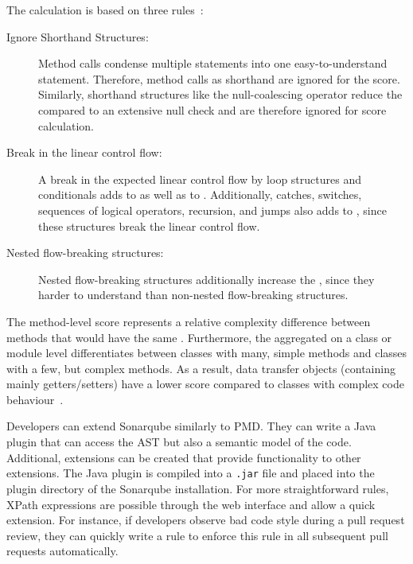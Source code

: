 The calculation is based on three rules~\cite{campbell2018cognitive}:
\begin{description}
    \item[Ignore Shorthand Structures:] Method calls condense multiple statements into one easy-to-understand statement. Therefore, method calls as shorthand are ignored for the score. Similarly, shorthand structures like the null-coalescing operator reduce the  compared to an extensive null check and are therefore ignored for score calculation.
    \item[Break in the linear control flow:] A break in the expected linear control flow by loop structures and conditionals adds to  as well as to . Additionally, catches, switches, sequences of logical operators, recursion, and jumps also adds to , since these structures break the linear control flow.
    \item[Nested flow-breaking structures:] Nested flow-breaking structures additionally increase the , since they harder to understand than non-nested flow-breaking structures.  
\end{description}
The method-level  score represents a relative complexity difference between methods that would have the same . Furthermore, the aggregated  on a class or module level differentiates between classes with many, simple methods and classes with a few, but complex methods. As a result, data transfer objects (containing mainly getters/setters) have a lower score compared to classes with complex code behaviour~\cite{campbell2018cognitive}.

Developers can extend Sonarqube similarly to PMD. They can write a Java plugin that can access the AST but also a semantic model of the code. Additional, extensions can be created that provide functionality to other extensions. The Java plugin is compiled into a \texttt{.jar} file and placed into the plugin directory of the Sonarqube installation. For more straightforward rules, XPath expressions are possible through the web interface and allow a quick extension. For instance, if developers observe bad code style during a pull request review, they can quickly write a rule to enforce this rule in all subsequent pull requests automatically.

